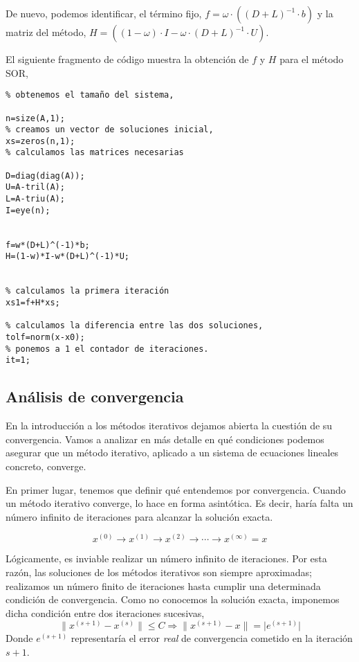 De nuevo, podemos identificar, el término fijo, $f=\omega\cdot\left((D+L)^{-1}\cdot b\right)$ y la matriz del método, $H=\left((1-\omega)\cdot I-\omega\cdot(D+L)^{-1}\cdot U\right)$.

El siguiente fragmento de código muestra la obtención de $f$ y $H$ para el método SOR,

\begin{lstlisting}
% obtenemos el tamaño del sistema,

n=size(A,1);
% creamos un vector de soluciones inicial,
xs=zeros(n,1);
% calculamos las matrices necesarias

D=diag(diag(A));
U=A-tril(A);
L=A-triu(A);
I=eye(n);


f=w*(D+L)^(-1)*b;
H=(1-w)*I-w*(D+L)^(-1)*U;


% calculamos la primera iteración
xs1=f+H*xs;

% calculamos la diferencia entre las dos soluciones,
tolf=norm(x-x0);
% ponemos a 1 el contador de iteraciones.
it=1;
\end{lstlisting}

\subsection{Análisis de convergencia}
En la introducción a los métodos iterativos dejamos abierta la cuestión de su convergencia. Vamos a analizar en más detalle en qué condiciones podemos asegurar que un método iterativo, aplicado a un sistema de ecuaciones lineales concreto, converge. 

En primer lugar, tenemos que definir qué entendemos por convergencia. Cuando un método iterativo converge, lo hace en forma asintótica. Es decir, haría falta un número infinito de iteraciones para alcanzar la solución exacta.

\begin{equation*}
x^{(0)}\rightarrow x^{(1)} \rightarrow x^{(2)}\rightarrow \cdots \rightarrow x^{(\infty)}=x
\end{equation*}

Lógicamente, es inviable realizar un número infinito de iteraciones. Por esta razón, las soluciones de los métodos iterativos son siempre aproximadas; realizamos un número finito de iteraciones hasta cumplir una determinada condición de convergencia. Como no conocemos la solución exacta, imponemos dicha condición entre dos iteraciones sucesivas,
\begin{equation*}
 \lVert x^{(s+1)}-x^{(s)}\rVert \leq C \Rightarrow  \lVert x^{(s+1)}-x\rVert = \lvert e^{(s+1)} \rvert
\end{equation*}
Donde $e^{(s+1)}$ representaría el error \emph{real} de convergencia cometido en la iteración $s+1$.

